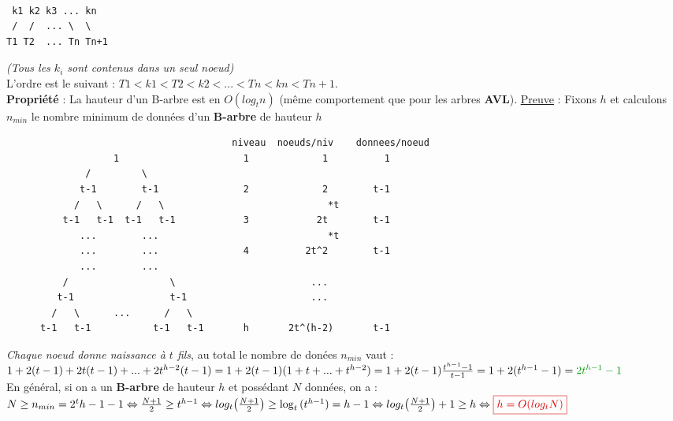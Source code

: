 \documentclass{article}
\newcommand{\gre}[1]{\textcolor{darkgreen}{#1}}
\newcommand{\red}[1]{\textcolor{darkred}{#1}}
\begin{document}
\begin{lstlisting}

 k1 k2 k3 ... kn 
 /  /  ... \  \
T1 T2  ... Tn Tn+1

\end{lstlisting}

\textit{(Tous les $k_i$ sont contenus dans un seul noeud)} \\

\noindent L'ordre est le suivant : $T1<k1<T2<k2< ... <Tn<kn<Tn+1$. \\
\newpage
\noindent \textbf{Propriété} : La hauteur d'un B-arbre est en $O(log_tn)$ (même comportement que pour les arbres 
\textbf{AVL}).
\underline{Preuve} : Fixons $h$ et calculons $n_{min}$ le nombre minimum de données d'un \textbf{B-arbre} de 
hauteur $h$ \\

\begin{lstlisting}
                                        niveau  noeuds/niv    donnees/noeud
                   1                      1             1          1
              /         \
             t-1        t-1               2             2        t-1
            /   \      /   \                             *t
          t-1   t-1  t-1   t-1            3            2t        t-1
             ...        ...                              *t
             ...        ...               4          2t^2        t-1
             ...        ...                           
          /                  \                        ...
         t-1                 t-1                      ...
        /   \      ...      /   \
      t-1   t-1           t-1   t-1       h       2t^(h-2)       t-1        
\end{lstlisting}
\textit{Chaque noeud donne naissance à $t$ fils}, au total le nombre de donées $n_{min}$ vaut : \\
$ 1+2(t-1)+2t(t-1)+ ... + 2t^{h-2}(t-1) \\
= 1 + 2(t-1) (1+t+...+t^{h-2}) \\
= 1 + 2(t-1) \frac{t^{h-1}-1}{t-1} \\
= 1 + 2(t^{h-1} - 1) \\
= \gre{2t^{h-1}-1}$ \\
En général, si on a un \textbf{B-arbre} de hauteur $h$ et possédant $N$ données, on a : \\
$N \geq n_{min} = 2^t{h-1}-1 \\
\Leftrightarrow \frac{N+1}{2} \geq t^{h-1} \\
\Leftrightarrow log_t{\left(\frac{N+1}{2}\right)} \geq \log_t{(t^{h-1})} = h-1 \\
\Leftrightarrow log_t{\left(\frac{N+1}{2}\right)} + 1 \geq h \\
\Leftrightarrow \red{\boxed{h = O(log_tN)}}$ \\
\end{document}
